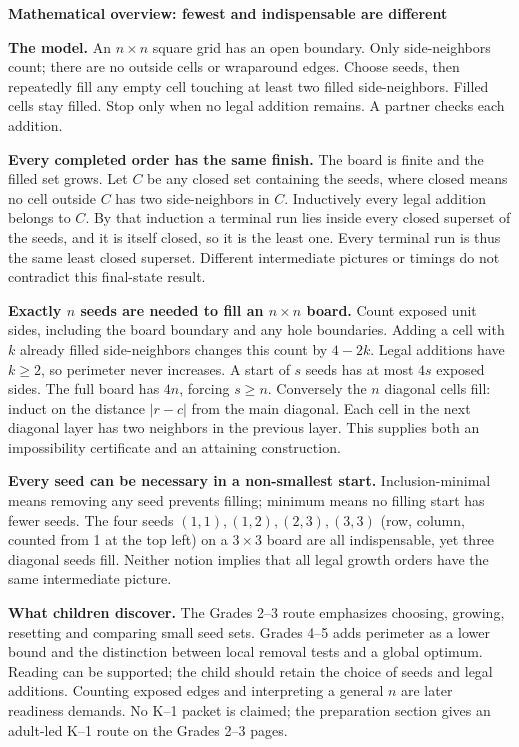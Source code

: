 \documentclass[11pt]{article}
\newcommand{\head}[1]{\par\textbf{\large #1}\par}
\begin{document}
\head{Mathematical overview: fewest and indispensable are different}
\textbf{The model.} An $n\times n$ square grid has an open boundary. Only side-neighbors count; there are no outside cells or wraparound edges. Choose seeds, then repeatedly fill any empty cell touching at least two filled side-neighbors. Filled cells stay filled. Stop only when no legal addition remains. A partner checks each addition.

\textbf{Every completed order has the same finish.} The board is finite and the filled set grows. Let $C$ be any closed set containing the seeds, where closed means no cell outside $C$ has two side-neighbors in $C$. Inductively every legal addition belongs to $C$. By that induction a terminal run lies inside every closed superset of the seeds, and it is itself closed, so it is the least one. Every terminal run is thus the same least closed superset. Different intermediate pictures or timings do not contradict this final-state result.

\textbf{Exactly $n$ seeds are needed to fill an $n\times n$ board.} Count exposed unit sides, including the board boundary and any hole boundaries. Adding a cell with $k$ already filled side-neighbors changes this count by $4-2k$. Legal additions have $k\ge2$, so perimeter never increases. A start of $s$ seeds has at most $4s$ exposed sides. The full board has $4n$, forcing $s\ge n$. Conversely the $n$ diagonal cells fill: induct on the distance $|r-c|$ from the main diagonal. Each cell in the next diagonal layer has two neighbors in the previous layer. This supplies both an impossibility certificate and an attaining construction.

\textbf{Every seed can be necessary in a non-smallest start.} Inclusion-minimal means removing any seed prevents filling; minimum means no filling start has fewer seeds. The four seeds $(1,1),(1,2),(2,3),(3,3)$ (row, column, counted from 1 at the top left) on a $3\times3$ board are all indispensable, yet three diagonal seeds fill. Neither notion implies that all legal growth orders have the same intermediate picture.

\textbf{What children discover.} The Grades 2--3 route emphasizes choosing, growing, resetting and comparing small seed sets. Grades 4--5 adds perimeter as a lower bound and the distinction between local removal tests and a global optimum. Reading can be supported; the child should retain the choice of seeds and legal additions. Counting exposed edges and interpreting a general $n$ are later readiness demands. No K--1 packet is claimed; the preparation section gives an adult-led K--1 route on the Grades 2--3 pages.
\end{document}
